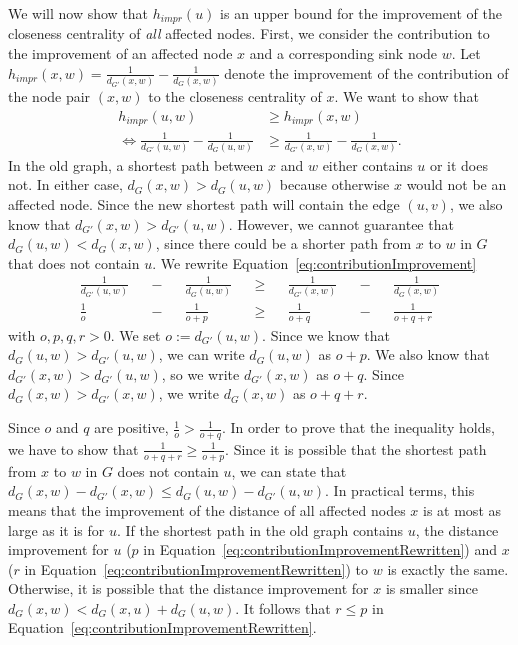 We will now show that $h_{impr}(u)$ is an upper bound for the improvement of the closeness centrality of \emph{all} affected nodes. First, we consider the contribution to the improvement of an affected node $x$ and a corresponding sink node $w$. Let $h_{impr}(x, w) = \frac{1}{d_{G'}(x, w)} - \frac{1}{d_{G}(x, w)} $ denote the improvement of the contribution of the node pair $(x, w)$ to the closeness centrality of $x$. We want to show that 
\begin{align}
	h_{impr}(u, w) &\geq h_{impr}(x, w) \nonumber \\
	\iff \frac{1}{d_{G'}(u, w)} - \frac{1}{d_{G}(u, w)} &\geq \frac{1}{d_{G'}(x, w)} - \frac{1}{d_{G}(x, w)} \label{eq:contributionImprovement}.
\end{align}
In the old graph, a shortest path between $x$ and $w$ either contains $u$ or it does not. In either case, $d_G(x, w) > d_G(u, w)$ because otherwise $x$ would not be an affected node. Since the new shortest path will contain the edge $(u, v)$, we also know that $d_{G'}(x, w) > d_{G'}(u, w)$. However, we cannot guarantee that $d_G(u, w) < d_G(x, w)$, since there could be a shorter path from $x$ to $w$ in $G$ that does not contain $u$. We rewrite Equation~\ref{eq:contributionImprovement}
\begin{align}
    \frac{1}{d_{G'}(u, w)} &&-&& \frac{1}{d_{G}(u, w)} &&\geq && \frac{1}{d_{G'}(x, w)} &&-&& \frac{1}{d_{G}(x, w)} \nonumber \\ 
	\frac{1}{o} &&-&& \frac{1}{o + p} &&\geq && \frac{1}{o + q} &&-&& \frac{1}{o + q + r} \label{eq:contributionImprovementRewritten}
\end{align}
with $o, p, q, r > 0$. We set $o := d_{G'}(u, w)$. Since we know that $d_G(u, w) > d_{G'}(u, w)$, we can write $d_G(u, w)$ as $o + p$. We also know that $d_{G'}(x, w) > d_{G'}(u, w)$, so we write $d_{G'}(x, w)$ as $o + q$. Since $d_{G}(x, w) > d_{G'}(x, w)$, we write $d_G(x, w)$ as $o + q + r$.

Since $o$ and $q$ are positive, $\frac{1}{o} > \frac{1}{o + q}$. In order to prove that the inequality holds, we have to show that $\frac{1}{o + q + r} \geq \frac{1}{o + p}$. Since it is possible that the shortest path from $x$ to $w$ in $G$ does not contain $u$, we can state that $d_G(x, w) - d_{G'}(x, w) \leq d_G(u, w) - d_{G'}(u, w)$. In practical terms, this means that the improvement of the distance of all affected nodes $x$ is at most as large as it is for $u$. If the shortest path in the old graph contains $u$, the distance improvement for $u$ ($p$ in Equation~\ref{eq:contributionImprovementRewritten}) and $x$ ($r$ in Equation~\ref{eq:contributionImprovementRewritten}) to $w$ is exactly the same. Otherwise, it is possible that the distance improvement for $x$ is smaller since $d_G(x, w) < d_G(x, u) + d_G(u, w)$. It follows that $r \leq p$ in Equation~\ref{eq:contributionImprovementRewritten}. 

